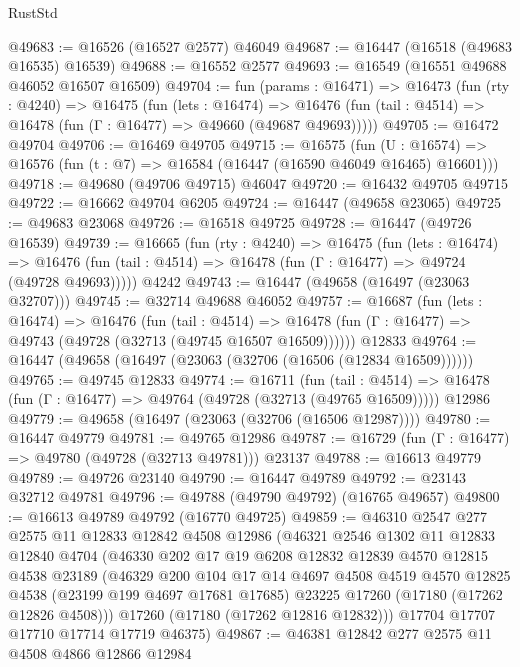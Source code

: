 \begin{lexlean}{RustStd}
\begin{coremodule}
@49683 := @16526 (@16527 @2577) @46049
@49687 := @16447 (@16518 (@49683 @16535) @16539)
@49688 := @16552 @2577
@49693 := @16549 (@16551 @49688 @46052 @16507 @16509)
@49704 := fun (params : @16471) =>
  @16473
    (fun (rty : @4240) =>
    @16475
      (fun (lets : @16474) =>
      @16476 (fun (tail : @4514) => @16478 (fun (Γ : @16477) => @49660 (@49687 @49693)))))
@49705 := @16472 @49704
@49706 := @16469 @49705
@49715 := @16575
    (fun (U : @16574) => @16576 (fun (t : @7) => @16584 (@16447 (@16590 @46049 @16465) @16601)))
@49718 := @49680 (@49706 @49715) @46047
@49720 := @16432 @49705 @49715
@49722 := @16662 @49704 @6205
@49724 := @16447 (@49658 @23065)
@49725 := @49683 @23068
@49726 := @16518 @49725
@49728 := @16447 (@49726 @16539)
@49739 := @16665
    (fun (rty : @4240) =>
    @16475
      (fun (lets : @16474) =>
      @16476 (fun (tail : @4514) => @16478 (fun (Γ : @16477) => @49724 (@49728 @49693)))))
    @4242
@49743 := @16447 (@49658 (@16497 (@23063 @32707)))
@49745 := @32714 @49688 @46052
@49757 := @16687
    (fun (lets : @16474) =>
    @16476
      (fun (tail : @4514) =>
      @16478 (fun (Γ : @16477) => @49743 (@49728 (@32713 (@49745 @16507 @16509))))))
    @12833
@49764 := @16447 (@49658 (@16497 (@23063 (@32706 (@16506 (@12834 @16509))))))
@49765 := @49745 @12833
@49774 := @16711
    (fun (tail : @4514) => @16478 (fun (Γ : @16477) => @49764 (@49728 (@32713 (@49765 @16509)))))
    @12986
@49779 := @49658 (@16497 (@23063 (@32706 (@16506 @12987))))
@49780 := @16447 @49779
@49781 := @49765 @12986
@49787 := @16729 (fun (Γ : @16477) => @49780 (@49728 (@32713 @49781))) @23137
@49788 := @16613 @49779
@49789 := @49726 @23140
@49790 := @16447 @49789
@49792 := @23143 @32712 @49781
@49796 := @49788 (@49790 @49792) (@16765 @49657)
@49800 := @16613 @49789 @49792 (@16770 @49725)
@49859 := @46310
    @2547
    @277
    @2575
    @11
    @12833
    @12842
    @4508
    @12986
    (@46321
      @2546
      @1302
      @11
      @12833
      @12840
      @4704
      (@46330
        @202
        @17
        @19
        @6208
        @12832
        @12839
        @4570
        @12815
        @4538
        @23189
        (@46329
          @200
          @104
          @17
          @14
          @4697
          @4508
          @4519
          @4570
          @12825
          @4538
          (@23199 @199 @4697 @17681 @17685)
          @23225
          @17260
          (@17180 (@17262 @12826 @4508)))
        @17260
        (@17180 (@17262 @12816 @12832)))
      @17704
      @17707
      @17710
      @17714
      @17719
      @46375)
@49867 := @46381 @12842 @277 @2575 @11 @4508 @4866 @12866 @12984

\end{coremodule}
\end{lexlean}
